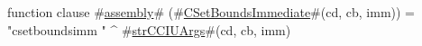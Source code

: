 function clause #\hyperref[sailMIPSzassembly]{assembly}# (#\hyperref[sailMIPSzCSetBoundsImmediate]{CSetBoundsImmediate}#(cd, cb, imm)) = "csetboundsimm " ^ #\hyperref[sailMIPSzstrCCIUArgs]{strCCIUArgs}#(cd, cb, imm)
